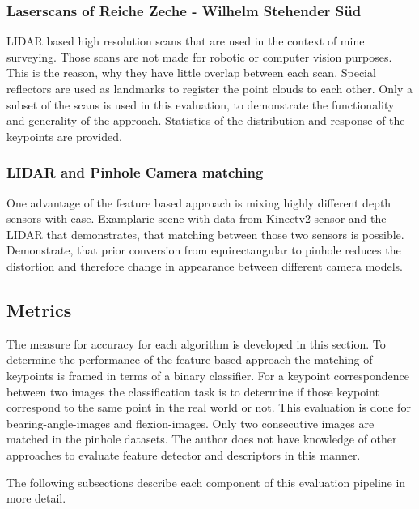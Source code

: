 \subsubsection{Laserscans of Reiche Zeche - Wilhelm Stehender Süd}

LIDAR based high resolution scans that are used in the context of mine surveying.
Those scans are not made for robotic or computer vision purposes.
This is the reason, why they have little overlap between each scan.
Special reflectors are used as landmarks to register the point clouds to each other.
Only a subset of the scans is used in this evaluation, to demonstrate the functionality and generality of the approach.
Statistics of the distribution and response of the keypoints are provided.

\subsubsection{LIDAR and Pinhole Camera matching}

One advantage of the feature based approach is mixing highly different depth sensors with ease.
Examplaric scene with data from Kinectv2 sensor and the LIDAR that demonstrates, that matching between those two sensors is possible.
Demonstrate, that prior conversion from equirectangular to pinhole reduces the distortion and therefore change in appearance between different camera models.


\subsection{Metrics}

The measure for accuracy for each algorithm is developed in this section.
To determine the performance of the feature-based approach the matching of keypoints is framed in terms of a binary classifier.
For a keypoint correspondence between two images the classification task is to determine if those keypoint correspond to the same point in the real world or not.
This evaluation is done for \Glspl{bearing-angle-image} and \Glspl{flexion-image}.
Only two consecutive images are matched in the pinhole datasets. 
The author does not have knowledge of other approaches to evaluate feature detector and descriptors in this manner.

The following subsections describe each component of this evaluation pipeline in more detail.


